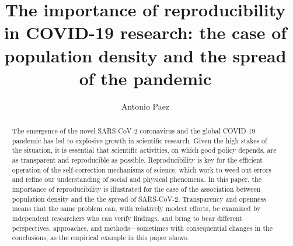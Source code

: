 \documentclass[]{elsarticle} %
\begin{document}
\begin{frontmatter}

  \title{The importance of reproducibility in COVID-19 research: the
case of population density and the spread of the pandemic}
    \author[McMaster University]{Antonio Paez}
      \address[McMaster University]{School of Earth, Environment and
Society, 1280 Main St West, Hamilton, Ontario L8S 4K1 Canada}
  
  \begin{abstract}
  The emergence of the novel SARS-CoV-2 coronavirus and the global
  COVID-19 pandemic has led to explosive growth in scientific research.
  Given the high stakes of the situation, it is essential that
  scientific activities, on which good policy depends, are as
  transparent and reproducible as possible. Reproducibility is key for
  the efficient operation of the self-correction mechanisms of science,
  which work to weed out errors and refine our understanding of social
  and physical phenomena. In this paper, the importance of
  reproducibility is illustrated for the case of the association between
  population density and the the spread of SARS-CoV-2. Transparency and
  openness means that the same problem can, with relatively modest
  efforts, be examined by independent researchers who can verify
  findings, and bring to bear different perspectives, approaches, and
  methods---sometimes with consequential changes in the conclusions, as
  the empirical example in this paper shows.
  \end{abstract}
  
 \end{frontmatter}
\end{document}
